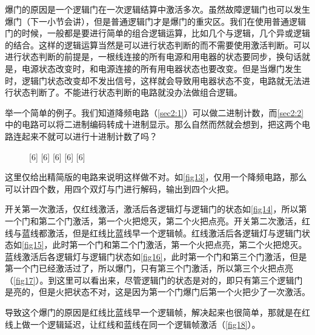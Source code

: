 爆门的原因是一个逻辑门在一次逻辑结算中激活多次。虽然故障逻辑门也可以发生爆门（下一小节会讲），但是普通逻辑门才是爆门的重灾区。我们在使用普通逻辑门的时候，一般都是要进行简单的组合逻辑运算，比如几个与逻辑，几个异或逻辑的结合。这样的逻辑运算当然是可以进行状态判断的而不需要使用激活判断。可以进行状态判断的前提是，一根线连接的所有电源和用电器的状态要同步，换句话就是，电源状态改变时，和电源连接的所有用电器状态也要改变。但是当爆门发生时，逻辑门状态改变却不发出信号，这样就会导致用电器状态不变，电路就无法进行状态判断了。不能进行状态判断的电路就没办法做组合逻辑。

举一个简单的例子。我们知道降频电路（\autoref{sec2:1}）可以做二进制计数，而\autoref{sec2:2}中的电路可以将二进制编码转成十进制显示。那么自然而然就会想到，把这两个电路连起来不就可以进行十进制计数了吗？

\begin{figure}[!ht]
  \centering
  [6]%
  [6]%
  [6]%
  [6]%
  [6]%
  \caption{}
\end{figure}

这里仅给出精简版的电路来说明这样做不对。如\autoref{fig13}，仅用一个降频电路，那么可以计四个数，用四个双灯与门进行解码，输出到四个火把。

开关第一次激活，仅红线激活，激活后各逻辑灯与逻辑门的状态如\autoref{fig14}，所以第一个门和第二个门激活，第一个火把熄灭，第二个火把点亮。开关第二次激活，红线与蓝线都激活，但是红线比蓝线早一个逻辑帧。红线激活后各逻辑灯与逻辑门状态如\autoref{fig15}，此时第一个门和第二个门激活，第一个火把点亮，第二个火把熄灭。蓝线激活后各逻辑灯与逻辑门状态如\autoref{fig16}，此时第一个门和第三个门激活，但是第一个门已经激活过了，所以爆门，只有第三个门激活，所以第三个火把点亮（\autoref{fig17}）。到这里可以看出来，尽管逻辑门的状态是对的，即只有第三个逻辑门是亮的，但是火把状态不对，这是因为第一个门爆门后第一个火把少了一次激活。

导致这个爆门的原因是红线比蓝线早一个逻辑帧，解决起来也很简单，那就是在红线上做一个逻辑延迟，让红线和蓝线在同一个逻辑帧激活（\autoref{fig18}）。

